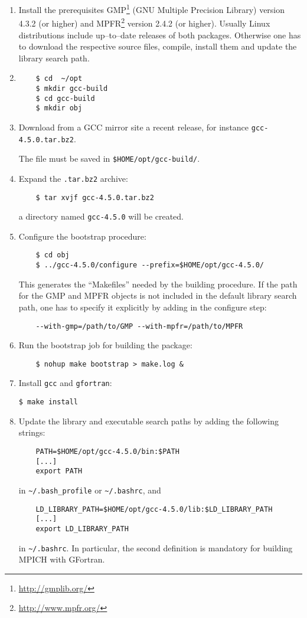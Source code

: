 \documentclass[a4paper,12pt]{article}%
\begin{document}
\begin{enumerate}
\item Install the prerequisites GMP\footnote{\url{http://gmplib.org/}}
  (GNU Multiple Precision Library) version 4.3.2 (or higher) and
  MPFR\footnote{\url{http://www.mpfr.org/}} version 2.4.2 (or
  higher). Usually Linux distributions include up--to--date releases
  of both packages. Otherwise one has to download the respective source
  files, compile, install them and update the library search path.
\item
  \begin{Verbatim}
    $ cd  ~/opt
    $ mkdir gcc-build
    $ cd gcc-build
    $ mkdir obj
  \end{Verbatim}
\item Download from a GCC mirror site a recent release, for instance
      \verb+gcc-4.5.0.tar.bz2+.

  The file must be saved in \verb+$HOME/opt/gcc-build/+.
\item Expand the \verb+.tar.bz2+ archive:
  \begin{Verbatim}
    $ tar xvjf gcc-4.5.0.tar.bz2
  \end{Verbatim}
  a directory named \verb+gcc-4.5.0+ will be created.
\item Configure the bootstrap procedure:
  \begin{Verbatim}
    $ cd obj
    $ ../gcc-4.5.0/configure --prefix=$HOME/opt/gcc-4.5.0/
  \end{Verbatim}
  This generates the ``Makefiles'' needed by the building procedure.
  If the path for the GMP and MPFR objects is not included in the
  default library search path, one has to specify it explicitly by
  adding in the configure step:
  \begin{Verbatim}
    --with-gmp=/path/to/GMP --with-mpfr=/path/to/MPFR
  \end{Verbatim}
\item Run the bootstrap job for building the package:
  \begin{Verbatim}
    $ nohup make bootstrap > make.log &
  \end{Verbatim}
\item Install \verb+gcc+ and \verb+gfortran+:
\begin{verbatim}
$ make install
\end{verbatim}
\item Update the library and executable search paths by adding the
  following strings:
  \begin{Verbatim}
    PATH=$HOME/opt/gcc-4.5.0/bin:$PATH
    [...]
    export PATH
  \end{Verbatim}
  in \verb+~/.bash_profile+ or \verb+~/.bashrc+, and
  \begin{Verbatim}
    LD_LIBRARY_PATH=$HOME/opt/gcc-4.5.0/lib:$LD_LIBRARY_PATH
    [...]
    export LD_LIBRARY_PATH
  \end{Verbatim}
  in \verb+~/.bashrc+. In particular, the second definition is
  mandatory for building MPICH with GFortran.
\end{enumerate}
\end{document}
